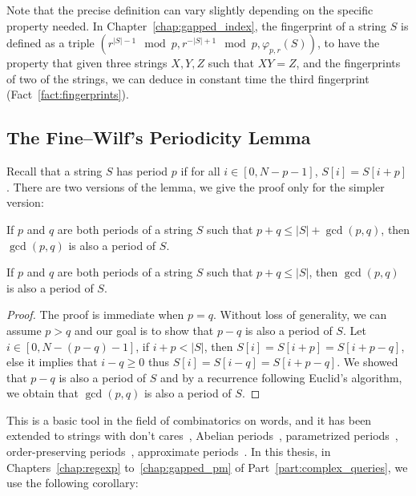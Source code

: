 Note that the precise definition can vary slightly depending on the specific property needed. In Chapter~\ref{chap:gapped_index}, the fingerprint of a string $S$ is defined as a triple $(r^{|S|-1} \mod p, r^{-|S|+1} \mod p, \varphi_{p,r}(S))$, to have the property that given three strings $X,Y,Z$ such that $XY =Z$, and the fingerprints of two of the strings, we can deduce in constant time the third fingerprint (Fact~\ref{fact:fingerprints}). 


\subsection{The Fine--Wilf's Periodicity Lemma}\label{sec:prelim:FW}

Recall that a string $S$ has period $p$ if for all $i \in [0,N-p-1]$, $S[i]=S[i+p]$. There are two versions of the lemma, we give the proof only for the simpler version:

\begin{lemma*}
If $p$ and $q$ are both periods of a string $S$ such that $p+q \leq |S|+\gcd(p,q)$, then $\gcd(p,q)$ is also a period of $S$.
\end{lemma*}

\begin{lemma*}
    If $p$ and $q$ are both periods of a string $S$ such that $p+q \leq |S|$, then $\gcd(p,q)$ is also a period of $S$.
\end{lemma*}
\begin{proof}
    The proof is immediate when $p=q$. Without loss of generality, we can assume $p > q$ and our goal is to show that $p-q$ is also a period of $S$. Let $i\in[0,N-(p-q)-1]$, if $i+p < |S|$, then $S[i]=S[i+p]=S[i+p-q]$, else it implies that $i-q \geq 0$ thus $S[i] = S[i-q] = S[i+p-q]$. We showed that $p-q$ is also a period of $S$ and by a recurrence following Euclid's algorithm, we obtain that $\gcd(p,q)$ is also a period of $S$.
\end{proof}


This is a basic tool in the field of combinatorics on words, and it has been extended to strings with don't cares~\cite{Berstel1999,Blanchet-Sadri2008,Blanchet-Sadri2002,Shur2004,Shur2001,Idiatulina2014,Kociumaka2022},
Abelian periods~\cite{Constantinescu2006,Blanchet-Sadri2013}, parametrized periods~\cite{Apostolico2008},
order-preserving periods~\cite{Matsuoka2016,GOURDEL2020104463}, approximate periods~\cite{AmirICALP2010,Amir2012,AMIR2015215}.
In this thesis, in Chapters~\ref{chap:regexp} to~\ref{chap:gapped_pm} of Part~\ref{part:complex_queries}, we use the following corollary:

